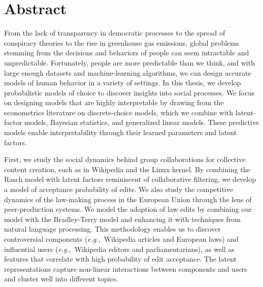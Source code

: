 \cleardoublepage
\chapter*{Abstract}

From the lack of transparency in democratic processes to the spread of conspiracy theories to the rise in greenhouse gas emissions, global problems stemming from the decisions and behaviors of people can seem intractable and unpredictable.
Fortunately, people are more predictable than we think, and with large enough datasets and machine-learning algorithms, we can design accurate models of human behavior in a variety of settings.
In this thesis, we develop probabilistic models of choice to discover insights into social processes.
We focus on designing models that are highly interpretable by drawing from the econometrics literature on discrete-choice models, which we combine with latent-factor models, Bayesian statistics, and generalized linear models.
These predictive models enable interpretability through their learned parameters and latent factors.

First, we study the social dynamics behind group collaborations for collective content creation, such as in Wikipedia and the Linux kernel.
By combining the Rasch model with latent factors reminiscent of collaborative filtering, we develop a model of acceptance probability of edits.
We also study the competitive dynamics of the law-making process in the European Union through the lens of peer-production systems.
We model the adoption of law edits by combining our model with the Bradley-Terry model and enhancing it with techniques from natural language processing.
This methodology enables us to discover controversial components (\textit{e.g.},~Wikipedia articles and European laws) and influential users (\textit{e.g.},~Wikipedia editors and parliamentarians), as well as features that correlate with high probability of edit acceptance.
The latent representations capture non-linear interactions between components and users and cluster well into different topics.


